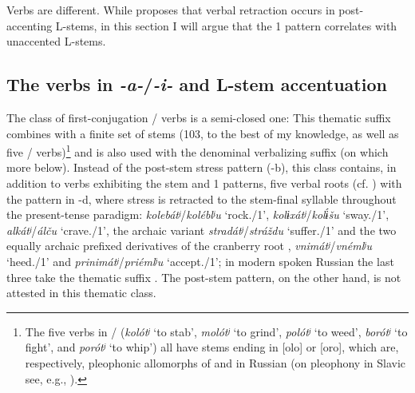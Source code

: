 \documentclass[output=paper,colorlinks,citecolor=black,koreanfont]{langscibook}
\begin{document}
\noindent Verbs are different. While \citet[291]{Melvold1989} proposes that verbal retraction occurs in post-accenting L-stems, in this section I will argue that the {1\SG} pattern correlates with unaccented L-stems.

\subsection{The verbs in \textit{-a-}/\textit{-i-} and L-stem accentuation}\label{mat:subsec:AIandLStems}

The class of first-conjugation / verbs is a semi-closed one: This thematic suffix combines with a finite set of stems (103, to the best of my knowledge, as well as five / verbs)\footnote{The five verbs in / (\textit{kolótʲ} ‘to stab’, \textit{molótʲ} ‘to grind’, \textit{polótʲ} ‘to weed’, \textit{borótʲ} ‘to fight’, and \textit{porótʲ} ‘to whip’) all have stems ending in [olo] or [oro], which are, respectively, pleophonic allomorphs of  and  in Russian (on pleophony in Slavic see, e.g., \citealt[36--37, 207]{SussexCumberley2006}).} and is also used with the denominal verbalizing suffix  (on which more below). Instead of the post-stem stress pattern (-b), this class contains, in addition to verbs exhibiting the stem and {1\SG} patterns, five verbal roots (cf. \citealt[115]{Gladney1995}) with the pattern in -d, where stress is retracted to the stem-final syllable throughout the present-tense paradigm: \textit{kolebátʲ}/\textit{koléblʲu} ‘rock.{\INF}/{1\SG}’, \textit{kolɨxátʲ}/\textit{kolɨ́šu} ‘sway.{\INF}/{1\SG}’, \textit{alkátʲ}/\textit{álču} ‘crave.{\INF}/{1\SG}’, the archaic variant \textit{stradátʲ}/\textit{stráždu} ‘suffer.{\INF}/{1\SG}’ and the two equally archaic prefixed derivatives of the cranberry root , \textit{vnimátʲ}/\textit{vnémlʲu} ‘heed.{\INF}/{1\SG}’ and \textit{prinimátʲ}/\textit{priémlʲu} ‘accept.{\INF}/{1\SG}’; in modern spoken Russian the last three take the thematic suffix . The post-stem pattern, on the other hand, is not attested in this thematic class.
\end{document}
